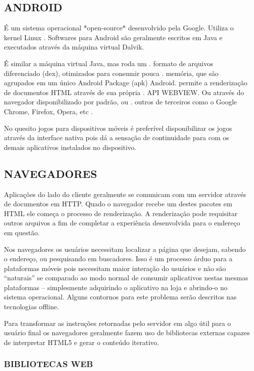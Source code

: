 \documentclass[11pt,a4paper]{article}
\begin{document}
\subsection{ANDROID}

É um sistema operacional *open-source* desenvolvido pela Google.
Utiliza o kernel Linux .
Softwares para Android são geralmente escritos em Java e executados
através da máquina virtual Dalvik.

É similar a máquina virtual Java, mas roda um  .
formato de arquivos diferenciado (dex), otimizados para consumir pouca .
memória, que são agrupados em um único Android Package (apk) Android.
permite a renderização de documentos HTML através de sua própria   .
API WEBVIEW. Ou através do navegador disponibilizado por padrão, ou  .
outros de terceiros como o Google Chrome, Firefox, Opera, etc          .

No quesito jogos para dispositivos móveis é preferível disponibilizar
os jogos através da interface nativa pois dá a sensação de
continuidade para com os demais aplicativos instalados no dispositivo.



\subsection{NAVEGADORES}

Aplicações do lado do cliente geralmente se comunicam com um
servidor através de documentos em HTTP. Quado o navegador recebe um
destes pacotes em HTML ele começa o processo de renderização. A
renderização pode requisitar outros arquivos a fim de completar a
experiência desenvolvida para o endereço em questão.

Nos navegadores os usuários necessitam localizar a página que desejam,
sabendo o endereço, ou pesquisando em buscadores. Isso é um processo
árduo para a plataformas móveis pois necessitam maior interação
do usuários e não são “naturais” se comparado ao modo normal
de consumir aplicativos nestas mesmas plataformas – simplesmente
adquirindo o aplicativo na loja e abrindo-o no sistema operacional.
Alguns contornos para este problema serão descritos nas tecnologias
offline.

Para transformar as instruções retornadas pelo servidor em algo útil
para o usuário final os navegadores geralmente fazem uso de bibliotecas
externas capazes de interpretar HTML5 e gerar o conteúdo iterativo.

\subsubsection{BIBLIOTECAS WEB}
\end{document}
